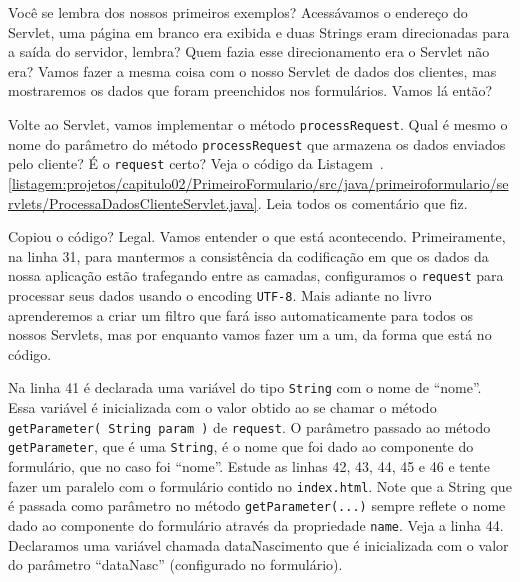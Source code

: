 Você se lembra dos nossos primeiros exemplos? Acessávamos o endereço do Servlet, uma página em branco era exibida e duas Strings eram direcionadas para a saída do servidor, lembra? Quem fazia esse direcionamento era o Servlet não era? Vamos fazer a mesma coisa com o nosso Servlet de dados dos clientes, mas mostraremos os dados que foram preenchidos nos formulários. Vamos lá então?

Volte ao Servlet, vamos implementar o método \texttt{processRequest}. Qual é mesmo o nome do parâmetro do método \texttt{processRequest} que armazena os dados enviados pelo cliente? É o \texttt{request} certo? Veja o código da Listagem~\thechapter.\ref{listagem:projetos/capitulo02/PrimeiroFormulario/src/java/primeiroformulario/servlets/ProcessaDadosClienteServlet.java}. Leia todos os comentário que fiz.


Copiou o código? Legal. Vamos entender o que está acontecendo. Primeiramente, na linha 31, para mantermos a consistência da codificação em que os dados da nossa aplicação estão trafegando entre as camadas, configuramos o \texttt{request} para processar seus dados usando o encoding \texttt{UTF-8}. Mais adiante no livro aprenderemos a criar um filtro que fará isso automaticamente para todos os nossos Servlets, mas por enquanto vamos fazer um a um, da forma que está no código.

Na linha 41 é declarada uma variável do tipo \texttt{String} com o nome de ``nome''. Essa variável é inicializada com o valor obtido ao se chamar o método \texttt{getParameter( String param )} de \texttt{request}. O parâmetro passado ao método \texttt{getParameter}, que é uma \texttt{String}, é o nome que foi dado ao componente do formulário, que no caso foi ``nome''. Estude as linhas 42, 43, 44, 45 e 46 e tente fazer um paralelo com o formulário contido no \texttt{index.html}. Note que a String que é passada como parâmetro no método \texttt{getParameter(...)} sempre reflete o nome dado ao componente do formulário através da propriedade \texttt{name}. Veja a linha 44. Declaramos uma variável chamada dataNascimento que é inicializada com o valor do parâmetro ``dataNasc'' (configurado no formulário).

